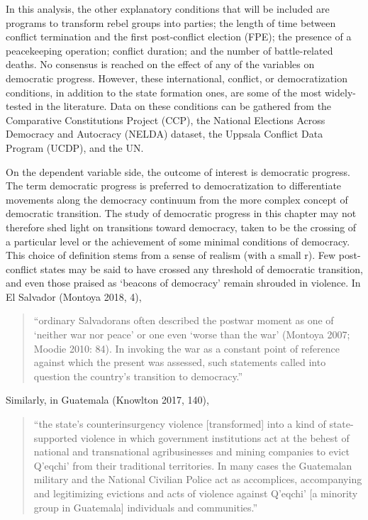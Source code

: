 \documentclass [11pt]{article}
\begin{document}
In this analysis, the other explanatory conditions that will be included are programs to transform rebel groups into parties; the length of time between conflict termination and the first post-conflict election (FPE); the presence of a peacekeeping operation; conflict duration; and the number of battle-related deaths. No consensus is reached on the effect of any of the variables on democratic progress. However, these international, conflict, or democratization conditions, in addition to the state formation ones, are some of the most widely-tested in the literature. Data on these conditions can be gathered from the Comparative Constitutions Project (CCP), the National Elections Across Democracy and Autocracy (NELDA) dataset, the Uppsala Conflict Data Program (UCDP), and the UN.

On the dependent variable side, the outcome of interest is democratic progress. The term democratic progress is preferred to democratization to differentiate movements along the democracy continuum from the more complex concept of democratic transition. The study of democratic progress in this chapter may not therefore shed light on transitions toward democracy, taken to be the crossing of a particular level or the achievement of some minimal conditions of democracy. This choice of definition stems from a sense of realism (with a small r). Few post-conflict states may be said to have crossed any threshold of democratic transition, and even those praised as `beacons of democracy' remain shrouded in violence. In El Salvador (Montoya 2018, 4), 

\begin{quote}
\small
``ordinary Salvadorans often described the postwar moment as one of ‘neither war nor peace’ or one even ‘worse than the war’ (Montoya 2007; Moodie 2010: 84). In invoking the war as a constant point of reference against which the present was assessed, such statements called into question the country’s transition to democracy.''
\end{quote}

Similarly, in Guatemala (Knowlton 2017, 140),

\begin{quote}
``the state’s counterinsurgency violence [transformed] into a kind of state-supported violence in which government institutions act at the behest of national and transnational agribusinesses and mining companies to evict Q’eqchi’ from their traditional territories. In many cases the Guatemalan military and the National Civilian Police act as accomplices, accompanying and legitimizing evictions and acts of violence against Q’eqchi’ [a minority group in Guatemala] individuals and communities.''
\end{quote}
\end{document}
